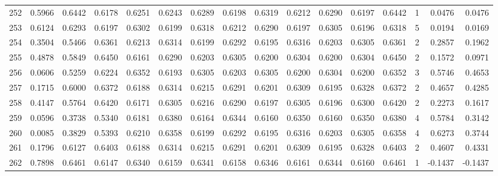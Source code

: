 \begin{tabular}{lrrrrrrrrrrrrrrr}
252 &      0.5966 &  0.6442 &  0.6178 &  0.6251 &  0.6243 &  0.6289 &  0.6198 &  0.6319 &  0.6212 &  0.6290 &   0.6197 &     0.6442 &      1 &                    0.0476 &                     0.0476 \\
253 &      0.6124 &  0.6293 &  0.6197 &  0.6302 &  0.6199 &  0.6318 &  0.6212 &  0.6290 &  0.6197 &  0.6305 &   0.6196 &     0.6318 &      5 &                    0.0194 &                     0.0169 \\
254 &      0.3504 &  0.5466 &  0.6361 &  0.6213 &  0.6314 &  0.6199 &  0.6292 &  0.6195 &  0.6316 &  0.6203 &   0.6305 &     0.6361 &      2 &                    0.2857 &                     0.1962 \\
255 &      0.4878 &  0.5849 &  0.6450 &  0.6161 &  0.6290 &  0.6203 &  0.6305 &  0.6200 &  0.6304 &  0.6200 &   0.6304 &     0.6450 &      2 &                    0.1572 &                     0.0971 \\
256 &      0.0606 &  0.5259 &  0.6224 &  0.6352 &  0.6193 &  0.6305 &  0.6203 &  0.6305 &  0.6200 &  0.6304 &   0.6200 &     0.6352 &      3 &                    0.5746 &                     0.4653 \\
257 &      0.1715 &  0.6000 &  0.6372 &  0.6188 &  0.6314 &  0.6215 &  0.6291 &  0.6201 &  0.6309 &  0.6195 &   0.6328 &     0.6372 &      2 &                    0.4657 &                     0.4285 \\
258 &      0.4147 &  0.5764 &  0.6420 &  0.6171 &  0.6305 &  0.6216 &  0.6290 &  0.6197 &  0.6305 &  0.6196 &   0.6300 &     0.6420 &      2 &                    0.2273 &                     0.1617 \\
259 &      0.0596 &  0.3738 &  0.5340 &  0.6181 &  0.6380 &  0.6164 &  0.6344 &  0.6160 &  0.6350 &  0.6160 &   0.6350 &     0.6380 &      4 &                    0.5784 &                     0.3142 \\
260 &      0.0085 &  0.3829 &  0.5393 &  0.6210 &  0.6358 &  0.6199 &  0.6292 &  0.6195 &  0.6316 &  0.6203 &   0.6305 &     0.6358 &      4 &                    0.6273 &                     0.3744 \\
261 &      0.1796 &  0.6127 &  0.6403 &  0.6188 &  0.6314 &  0.6215 &  0.6291 &  0.6201 &  0.6309 &  0.6195 &   0.6328 &     0.6403 &      2 &                    0.4607 &                     0.4331 \\
262 &      0.7898 &  0.6461 &  0.6147 &  0.6340 &  0.6159 &  0.6341 &  0.6158 &  0.6346 &  0.6161 &  0.6344 &   0.6160 &     0.6461 &      1 &                   -0.1437 &                    -0.1437 \\

\end{tabular}
